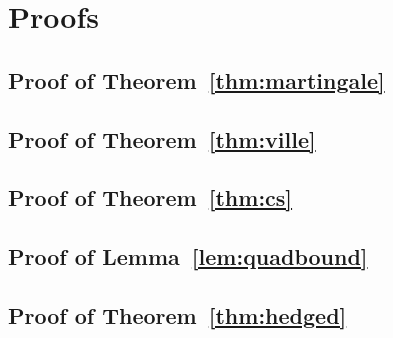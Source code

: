 

\newpage
\onecolumn
\appendix
\section{Proofs}

\subsection{Proof of Theorem~\ref{thm:martingale}}
\subsection{Proof of Theorem~\ref{thm:ville}}
\subsection{Proof of Theorem~\ref{thm:cs}}
\subsection{Proof of Lemma~\ref{lem:quadbound}}
\subsection{Proof of Theorem~\ref{thm:hedged}}
